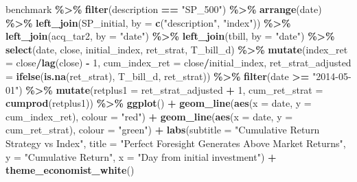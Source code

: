 \documentclass[
]{article}
\newenvironment{Shaded}{\begin{snugshade}}{\end{snugshade}}
\newcommand{\DataTypeTok}[1]{\textcolor[rgb]{0.13,0.29,0.53}{#1}}
\newcommand{\DecValTok}[1]{\textcolor[rgb]{0.00,0.00,0.81}{#1}}
\newcommand{\KeywordTok}[1]{\textcolor[rgb]{0.13,0.29,0.53}{\textbf{#1}}}
\newcommand{\NormalTok}[1]{#1}
\newcommand{\OperatorTok}[1]{\textcolor[rgb]{0.81,0.36,0.00}{\textbf{#1}}}
\newcommand{\StringTok}[1]{\textcolor[rgb]{0.31,0.60,0.02}{#1}}
\begin{document}
\begin{Shaded}
\begin{Highlighting}[]
\NormalTok{benchmark }\OperatorTok{\%\textgreater{}\%}
\StringTok{  }\KeywordTok{filter}\NormalTok{(description }\OperatorTok{==}\StringTok{ "SP\_500"}\NormalTok{) }\OperatorTok{\%\textgreater{}\%}
\StringTok{  }\KeywordTok{arrange}\NormalTok{(date) }\OperatorTok{\%\textgreater{}\%}
\StringTok{  }\KeywordTok{left\_join}\NormalTok{(SP\_initial, }\DataTypeTok{by =} \KeywordTok{c}\NormalTok{(}\StringTok{"description"}\NormalTok{, }\StringTok{"index"}\NormalTok{)) }\OperatorTok{\%\textgreater{}\%}
\StringTok{  }\KeywordTok{left\_join}\NormalTok{(acq\_tar2, }\DataTypeTok{by =} \StringTok{"date"}\NormalTok{) }\OperatorTok{\%\textgreater{}\%}
\StringTok{  }\KeywordTok{left\_join}\NormalTok{(tbill, }\DataTypeTok{by =} \StringTok{"date"}\NormalTok{) }\OperatorTok{\%\textgreater{}\%}
\StringTok{  }\KeywordTok{select}\NormalTok{(date, close, initial\_index, ret\_strat, T\_bill\_d) }\OperatorTok{\%\textgreater{}\%}
\StringTok{  }\KeywordTok{mutate}\NormalTok{(}\DataTypeTok{index\_ret =}\NormalTok{ close}\OperatorTok{/}\KeywordTok{lag}\NormalTok{(close) }\OperatorTok{{-}}\StringTok{ }\DecValTok{1}\NormalTok{,}
         \DataTypeTok{cum\_index\_ret =}\NormalTok{ close}\OperatorTok{/}\NormalTok{initial\_index,}
         \DataTypeTok{ret\_strat\_adjusted =} \KeywordTok{ifelse}\NormalTok{(}\KeywordTok{is.na}\NormalTok{(ret\_strat), T\_bill\_d, ret\_strat)) }\OperatorTok{\%\textgreater{}\%}
\StringTok{  }\KeywordTok{filter}\NormalTok{(date }\OperatorTok{\textgreater{}=}\StringTok{ "2014{-}05{-}01"}\NormalTok{) }\OperatorTok{\%\textgreater{}\%}
\StringTok{  }\KeywordTok{mutate}\NormalTok{(}\DataTypeTok{retplus1 =}\NormalTok{ ret\_strat\_adjusted }\OperatorTok{+}\StringTok{ }\DecValTok{1}\NormalTok{,}
    \DataTypeTok{cum\_ret\_strat =} \KeywordTok{cumprod}\NormalTok{(retplus1)) }\OperatorTok{\%\textgreater{}\%}
\StringTok{  }\KeywordTok{ggplot}\NormalTok{() }\OperatorTok{+}
\StringTok{  }\KeywordTok{geom\_line}\NormalTok{(}\KeywordTok{aes}\NormalTok{(}\DataTypeTok{x =}\NormalTok{ date, }\DataTypeTok{y =}\NormalTok{ cum\_index\_ret), }\DataTypeTok{colour =} \StringTok{"red"}\NormalTok{) }\OperatorTok{+}
\StringTok{  }\KeywordTok{geom\_line}\NormalTok{(}\KeywordTok{aes}\NormalTok{(}\DataTypeTok{x =}\NormalTok{ date, }\DataTypeTok{y =}\NormalTok{ cum\_ret\_strat), }\DataTypeTok{colour =} \StringTok{"green"}\NormalTok{) }\OperatorTok{+}
\StringTok{  }\KeywordTok{labs}\NormalTok{(}\DataTypeTok{subtitle =} \StringTok{"Cumulative Return Strategy vs Index"}\NormalTok{,}
       \DataTypeTok{title =} \StringTok{"Perfect Foresight Generates Above Market Returns"}\NormalTok{,}
       \DataTypeTok{y =} \StringTok{"Cumulative Return"}\NormalTok{,}
       \DataTypeTok{x =} \StringTok{"Day from initial investment"}\NormalTok{) }\OperatorTok{+}\StringTok{ }
\StringTok{  }\KeywordTok{theme\_economist\_white}\NormalTok{()}
\end{Highlighting}
\end{Shaded}
\end{document}
